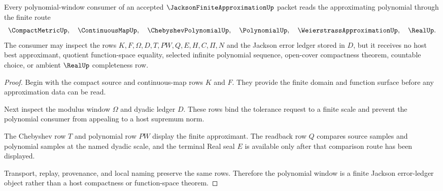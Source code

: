 \begin{theorem}
\label{thm:jackson-finite-approximation-polynomial-window}
Every polynomial-window consumer of an accepted $\JacksonFiniteApproximationUp$ packet reads the approximating polynomial through the finite route
$$
\CompactMetricUp,\quad \ContinuousMapUp,\quad \ChebyshevPolynomialUp,\quad \PolynomialUp,\quad \WeierstrassApproximationUp,\quad \RealUp .
$$
The consumer may inspect the rows $K,F,\Omega,D,T,PW,Q,E,H,C,\Pi,N$ and the Jackson error ledger stored in $D$, but it receives no host best approximant, quotient function-space equality, selected infinite polynomial sequence, open-cover compactness theorem, countable choice, or ambient $\RealUp$ completeness row.
\end{theorem}
\begin{proof}
Begin with the compact source and continuous-map rows $K$ and $F$. They provide the finite domain and function surface before any approximation data can be read.

Next inspect the modulus window $\Omega$ and dyadic ledger $D$. These rows bind the tolerance request to a finite scale and prevent the polynomial consumer from appealing to a host supremum norm.

The Chebyshev row $T$ and polynomial row $PW$ display the finite approximant. The readback row $Q$ compares source samples and polynomial samples at the named dyadic scale, and the terminal Real seal $E$ is available only after that comparison route has been displayed.

Transport, replay, provenance, and local naming preserve the same rows. Therefore the polynomial window is a finite Jackson error-ledger object rather than a host compactness or function-space theorem.
\end{proof}



